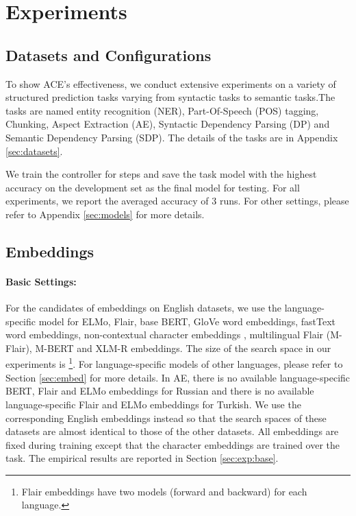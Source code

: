 \documentclass{article} \usepackage{iclr2021_conference,times}
\begin{document}
\section{Experiments}

\subsection{Datasets and Configurations}
To show ACE's effectiveness, we conduct extensive experiments on a variety of structured prediction tasks varying from syntactic tasks to semantic tasks.The tasks are named entity recognition (NER), Part-Of-Speech (POS) tagging, Chunking, Aspect Extraction (AE), Syntactic Dependency Parsing (DP) and Semantic Dependency Parsing (SDP). The details of the tasks are in Appendix \ref{sec:datasets}.

We train the controller for  steps and save the task model with the highest accuracy on the development set as the final model for testing. For all experiments, we report the averaged accuracy of 3 runs. For other settings, please refer to Appendix \ref{sec:models} for more details. 

\subsection{Embeddings}
\paragraph{Basic Settings:} For the candidates of embeddings on English datasets, we use the language-specific model for ELMo, Flair, base BERT, GloVe word embeddings, fastText word embeddings, non-contextual character embeddings \citep{lample-etal-2016-neural}, multilingual Flair (M-Flair), M-BERT and XLM-R embeddings. The size of the search space in our experiments is \footnote{Flair embeddings have two models (forward and backward) for each language.}. For language-specific models of other languages, please refer to Section \ref{sec:embed} for more details. In AE, there is no available language-specific BERT, Flair and ELMo embeddings for Russian and there is no available language-specific Flair and ELMo embeddings for Turkish. We use the corresponding English embeddings instead so that the search spaces of these datasets are almost identical to those of the other datasets. All embeddings are fixed during training except that the character embeddings are trained over the task. The empirical results are reported in Section \ref{sec:exp:base}.
\end{document}

